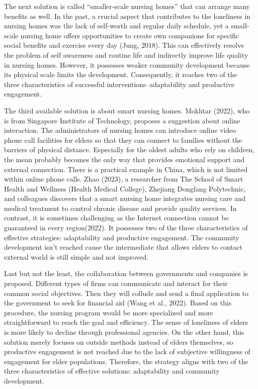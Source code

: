 \documentclass[12pt]{article}
\begin{document}
The next solution is called “smaller-scale nursing homes” that can arrange many benefits as well. In the past, a crucial aspect that contributes to the loneliness in nursing homes was the lack of self-worth and regular daily schedule, yet a small-scale nursing home offers opportunities to create own companions for specific social benefits and exercise every day (Jung, 2018). This can effectively resolve the problem of self awareness and routine life and indirectly improve life quality in nursing homes. However, it possesses weaker community development because its physical scale limits the development. Consequently, it reaches two of the three characteristics of successful interventions--adaptability and productive engagement.

The third available solution is about smart nursing homes. Mokhtar (2022), who is from Singapore Institute of Technology, proposes a suggestion about online interaction. The administrators of nursing homes can introduce online video phone call facilities for elders so that they can connect to families without the barriers of physical distance. Especially for the oldest adults who rely on children, the mean probably becomes the only way that provides emotional support and external connection. There is a practical example in China, which is not limited within online phone calls. Zhao (2023), a researcher from The School of Smart Health and Wellness (Health Medical College), Zhejiang Dongfang Polytechnic, and colleagues discovers that a smart nursing home integrates nursing care and medical treatment to control chronic disease and provide quality services. In contrast, it is sometimes challenging as the Internet connection cannot be guaranteed in every region(2022). It possesses two of the three characteristics of effective strategies: adaptability and productive engagement. The community development isn’t reached cause the intermediate that allows elders to contact external world is still simple and not improved. 

Last but not the least, the collaboration between governments and companies is proposed. Different types of firms can communicate and interact for their common social objectives. Then they will collude and send a final application to the government to seek for financial aid (Wang et al., 2022). Based on this procedure, the nursing program would be more specialized and more straightforward to reach the goal and efficiency. The sense of loneliness of elders is more likely to decline through professional agencies. On the other hand, this solution merely focuses on outside methods instead of elders themselves, so productive engagement is not reached due to the lack of subjective willingness of engagement for elder populations. Therefore, the strategy aligns with two of the three characteristics of effective solutions: adaptability and community development. 
\end{document}
